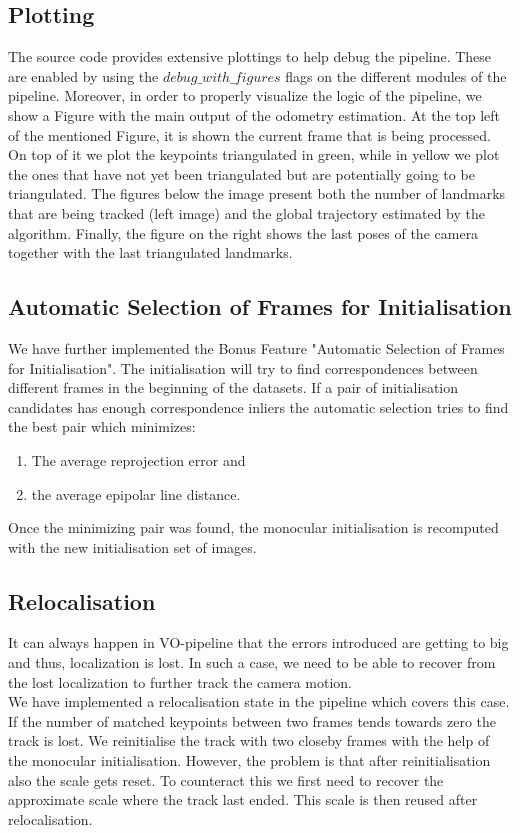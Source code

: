 \subsection{Plotting}
The source code provides extensive plottings to help debug the pipeline. These are enabled by using the $debug\_with\_figures$ flags
on the different modules of the pipeline. Moreover, in order to properly visualize the logic of the pipeline, we show a Figure 
with the main output of the odometry estimation.
At the top left of the mentioned Figure, it is shown the current frame that is being processed. On top of it we plot the keypoints
triangulated in green, while in yellow we plot the ones that have not yet been triangulated but are potentially going to be
triangulated.
The figures below the image present both the number of landmarks that are being tracked (left image) and the global trajectory
estimated by the algorithm.
Finally, the figure on the right shows the last poses of the camera together with the last triangulated landmarks.


\subsection{Automatic Selection of Frames for Initialisation}
We have further implemented the Bonus Feature "Automatic Selection of Frames for Initialisation". The initialisation will try to find correspondences between different frames in the beginning of the datasets. If a pair of initialisation candidates has enough correspondence inliers the automatic selection tries to find the best pair which minimizes:

\begin{enumerate}
\item The average reprojection error and 
\item the average epipolar line distance.
\end{enumerate}

Once the minimizing pair was found, the monocular initialisation is recomputed with the new initialisation set of images.

\subsection{Relocalisation}
It can always happen in VO-pipeline that the errors introduced are getting to big and thus, localization is lost. In such a case, we need to be able to recover from the lost localization to further track the camera motion. \\
We have implemented a relocalisation state in the pipeline which covers this case. If the number of matched keypoints between two frames tends towards zero the track is lost. We reinitialise the track with two closeby frames with the help of the monocular initialisation. However, the problem is that after reinitialisation also the scale gets reset. To counteract this we first need to recover the approximate scale where the track last ended. This scale is then reused after relocalisation. 

